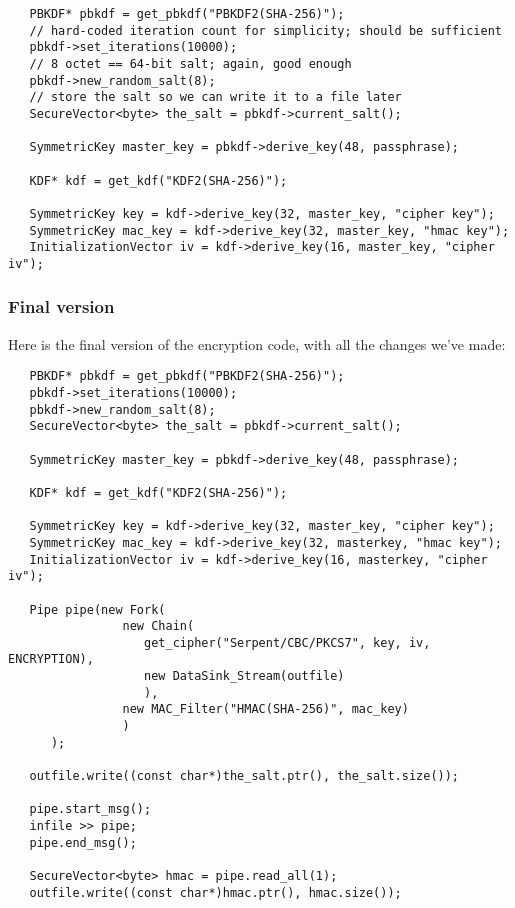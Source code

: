 \documentclass{article}
\begin{document}
\begin{verbatim}
   PBKDF* pbkdf = get_pbkdf("PBKDF2(SHA-256)");
   // hard-coded iteration count for simplicity; should be sufficient
   pbkdf->set_iterations(10000);
   // 8 octet == 64-bit salt; again, good enough
   pbkdf->new_random_salt(8);
   // store the salt so we can write it to a file later
   SecureVector<byte> the_salt = pbkdf->current_salt();

   SymmetricKey master_key = pbkdf->derive_key(48, passphrase);

   KDF* kdf = get_kdf("KDF2(SHA-256)");

   SymmetricKey key = kdf->derive_key(32, master_key, "cipher key");
   SymmetricKey mac_key = kdf->derive_key(32, master_key, "hmac key");
   InitializationVector iv = kdf->derive_key(16, master_key, "cipher iv");
\end{verbatim}

\subsubsection{Final version}

Here is the final version of the encryption code, with all the changes we've
made:

\begin{verbatim}
   PBKDF* pbkdf = get_pbkdf("PBKDF2(SHA-256)");
   pbkdf->set_iterations(10000);
   pbkdf->new_random_salt(8);
   SecureVector<byte> the_salt = pbkdf->current_salt();

   SymmetricKey master_key = pbkdf->derive_key(48, passphrase);

   KDF* kdf = get_kdf("KDF2(SHA-256)");

   SymmetricKey key = kdf->derive_key(32, master_key, "cipher key");
   SymmetricKey mac_key = kdf->derive_key(32, masterkey, "hmac key");
   InitializationVector iv = kdf->derive_key(16, masterkey, "cipher iv");

   Pipe pipe(new Fork(
                new Chain(
                   get_cipher("Serpent/CBC/PKCS7", key, iv, ENCRYPTION),
                   new DataSink_Stream(outfile)
                   ),
                new MAC_Filter("HMAC(SHA-256)", mac_key)
                )
      );

   outfile.write((const char*)the_salt.ptr(), the_salt.size());

   pipe.start_msg();
   infile >> pipe;
   pipe.end_msg();

   SecureVector<byte> hmac = pipe.read_all(1);
   outfile.write((const char*)hmac.ptr(), hmac.size());
\end{verbatim}
\end{document}
